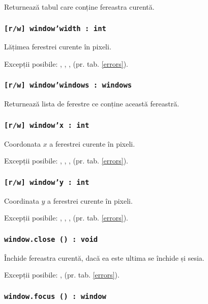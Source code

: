 Returnează tabul care conține fereastra curentă.

\subsubsection{\texttt{[r/w] window'width : int}}

Lățimea ferestrei curente în pixeli.

Excepții posibile: , , ,  (pr. tab. \ref{errors}).

\subsubsection{\texttt{[r/w] window'windows : windows}}

Returnează lista de ferestre ce conține această fereastră.

\subsubsection{\texttt{[r/w] window'x : int}}

Coordonata $x$ a ferestrei curente în pixeli.

Excepții posibile: , , ,  (pr. tab. \ref{errors}).

\subsubsection{\texttt{[r/w] window'y : int}}

Coordinata $y$ a ferestrei curente în pixeli.

Excepții posibile: , , ,  (pr. tab. \ref{errors}).

\subsubsection{\texttt{window.close () : void}}

Închide fereastra curentă, dacă ea este ultima se închide și sesia.

Excepții posibile: ,  (pr. tab. \ref{errors}).

\subsubsection{\texttt{window.focus () : window}}

